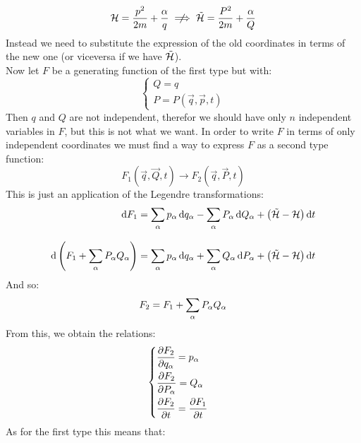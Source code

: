 \begin{equation}
    \hamfun = \dfrac{p^2}{2m} + \dfrac{\alpha}{q} \notimplies \tilde{\hamfun} = \dfrac{P^2}{2m} + \dfrac{\alpha}{Q}
\end{equation}
Instead we need to substitute the expression of the old coordinates in terms of the new one (or viceversa if we have $\tilde{\mathcal{H}}$).\\
Now let $F$ be a generating function of the first type but with:
\begin{equation}
    \begin{cases}
        Q = q\\[8pt]
        P = P(\vec{q},\vec{p},t)
    \end{cases}
\end{equation}
Then $q$ and $Q$ are not independent, therefor we should have only $n$ independent variables in $F$, but this is not what we want. In order to write $F$ in terms of only independent coordinates we must find a way to express $F$ as a second type function:
\begin{equation}
    F_1(\vec{q},\vec{Q},t) \longrightarrow F_2(\vec{q},\vec{P},t)
\end{equation}
This is just an application of the Legendre transformations:
\begin{equation}
    \begin{split}
        \dd{F_1} &= \displaystyle\sum_{\alpha}p_{\alpha}\dd{q_{\alpha}} - \displaystyle\sum_{\alpha}P_{\alpha}\dd{Q_{\alpha}} + \left(\tilde{\mathcal{H}}- \mathcal{H}\right)\dd{t}\\[8pt]
        \dd{\left(F_1 + \displaystyle\sum_{\alpha}P_{\alpha}Q_{\alpha}\right)} &= \displaystyle\sum_{\alpha}p_{\alpha}\dd{q_{\alpha}}  + \displaystyle\sum_{\alpha}Q_{\alpha}\dd{P_{\alpha}} + \left(\tilde{\mathcal{H}}- \mathcal{H}\right)\dd{t}
    \end{split}
\end{equation}
And so:
\begin{equation}
    F_2 = F_1 + \displaystyle\sum_{\alpha}P_{\alpha}Q_{\alpha}
\end{equation}
From this, we obtain the relations:
\begin{equation}
    \begin{cases}
        \pdv{F_2}{q_{\alpha}} = p_{\alpha}\\[8pt]
        \pdv{F_2}{P_{\alpha}} = Q_{\alpha}\\[8pt]
        \pdv{F_2}{t} = \pdv{F_1}{t}
    \end{cases}
\end{equation}
As for the first type this means that:

